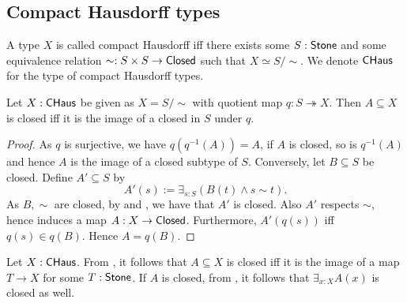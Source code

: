 \subsection{Compact Hausdorff types}


\begin{definition}
  A type $X$ is called compact Hausdorff iff there exists some $S:\mathsf{Stone}$ and some 
  equivalence relation $\sim:S \times S \to \mathsf{Closed}$ such that $X \simeq S / \sim$. 
  We denote $\mathsf{CHaus}$ for the type of compact Hausdorff types. 
\end{definition} 

\begin{lemma}\label{CompactHausdorffClosed}
  Let $X:\mathsf{CHaus}$ be given as $X=S/\sim$ with quotient map $q:S\twoheadrightarrow X$.
  Then $A\subseteq X$ is closed iff it is the image of a closed in $S$ under $q$. 
\end{lemma}
\begin{proof}
  As $q$ is surjective, we have $q(q^{-1}(A)) = A$,
  if $A$ is closed, so is $q^{-1}(A)$ and 
  hence $A$ is the image of a closed subtype of $S$. 
  Conversely, let $B\subseteq S$ be closed. 
  Define $A'\subseteq S$ by 
  $$A'(s) := \exists_{s:S} (B(t) \wedge s \sim t).$$
  As $B, \sim$ are closed, by  and , 
  we have that $A'$  is closed. 
  Also $A'$ respects $\sim$, hence induces a map $A: X\to \mathsf{Closed}$.
  Furthermore, $A'(q(s))$ iff $q(s)\in q(B)$. 
  Hence $A=q(B)$. 
\end{proof}
\begin{remark}\label{InhabitedClosedSubSpaceClosedCHaus}
  Let $X:\mathsf{CHaus}$.
  From , it follows that $A\subseteq X$ is closed iff it is the image of a map 
  $T\to X$ for some $T:\mathsf{Stone}$. 
  If $A$ is closed, from , it follows that $\exists_{x:X} A(x)$ is closed as well. 
\end{remark}
